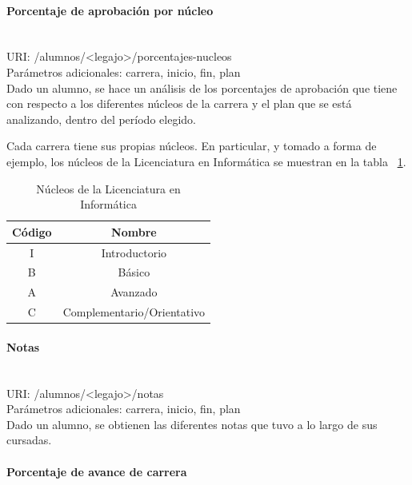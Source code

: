 \paragraph{Porcentaje de aprobación por núcleo}\mbox{}\\

URI: /alumnos/<legajo>/porcentajes-nucleos \\

Parámetros adicionales: carrera, inicio, fin, plan \\

Dado un alumno, se hace un análisis de los porcentajes de aprobación que tiene con respecto a los diferentes núcleos de la carrera y el plan que se está analizando, dentro del período elegido.

Cada carrera tiene sus propias núcleos. En particular, y tomado a forma de ejemplo, los núcleos de la Licenciatura en Informática se muestran en la tabla ~\ref{tab:tabla_nucleos}.

\begin{table}[!htbp]
    \centering
    \makegapedcells
    \begin{tabular}{|c|c|}
    \hline
    Código & Nombre \\ \hline
    I & Introductorio \\ \hline
    B & Básico\\ \hline
    A & Avanzado \\ \hline
    C & Complementario/Orientativo \\ \hline
    \end{tabular}
    \caption{Núcleos de la Licenciatura en Informática}
    \label{tab:tabla_nucleos}
\end{table}


\paragraph{Notas}\mbox{}\\

URI: /alumnos/<legajo>/notas \\

Parámetros adicionales: carrera, inicio, fin, plan \\

Dado un alumno, se obtienen las diferentes notas que tuvo a lo largo de sus cursadas.

\paragraph{Porcentaje de avance de carrera}\mbox{}\\

